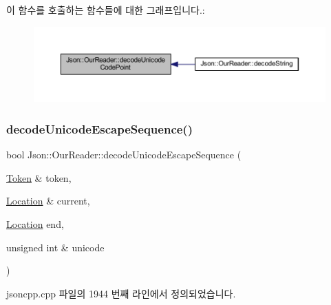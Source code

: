 이 함수를 호출하는 함수들에 대한 그래프입니다.\+:\nopagebreak
\begin{figure}[H]
\begin{center}
\leavevmode
\includegraphics[width=350pt]{class_json_1_1_our_reader_ac1bf03c161ece082e48da450c50f528d_icgraph}
\end{center}
\end{figure}
\mbox{\label{class_json_1_1_our_reader_adb39be814cc6076b91a0919bdd5b24b0}} 
\subsubsection{\texorpdfstring{decode\+Unicode\+Escape\+Sequence()}{decodeUnicodeEscapeSequence()}}
{\footnotesize\ttfamily bool Json\+::\+Our\+Reader\+::decode\+Unicode\+Escape\+Sequence (\begin{DoxyParamCaption}\item[{\hyperlink{class_json_1_1_our_reader_1_1_token}{Token} \&}]{token,  }\item[{\hyperlink{class_json_1_1_our_reader_a1bdc7bbc52ba87cae6b19746f2ee0189}{Location} \&}]{current,  }\item[{\hyperlink{class_json_1_1_our_reader_a1bdc7bbc52ba87cae6b19746f2ee0189}{Location}}]{end,  }\item[{unsigned int \&}]{unicode }\end{DoxyParamCaption})\hspace{0.3cm}{\ttfamily [private]}}



jsoncpp.\+cpp 파일의 1944 번째 라인에서 정의되었습니다.


